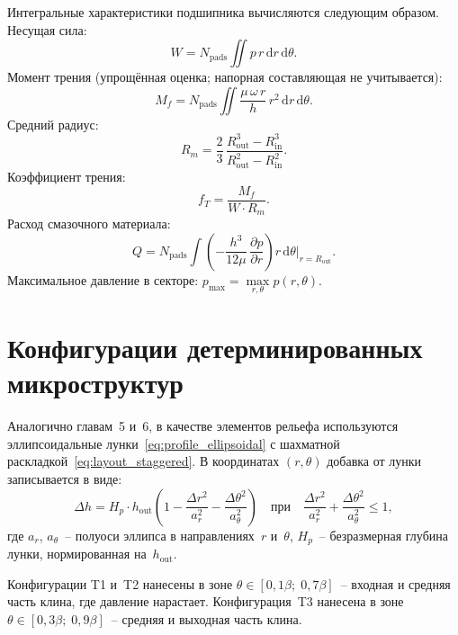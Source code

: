 Интегральные характеристики подшипника вычисляются следующим
образом. Несущая сила:
\begin{equation}
  W = N_{\mathrm{pads}} \iint p\, r\, \mathrm{d}r\, \mathrm{d}\theta.
  \label{eq:thrust_W}
\end{equation}
Момент трения (упрощённая оценка; напорная составляющая
не учитывается):
\begin{equation}
  M_f = N_{\mathrm{pads}} \iint
    \frac{\mu\, \omega\, r}{h}\, r^2\,
    \mathrm{d}r\, \mathrm{d}\theta.
  \label{eq:thrust_Mf}
\end{equation}
Средний радиус:
\begin{equation}
  R_m = \frac{2}{3}\,
    \frac{R_{\mathrm{out}}^3 - R_{\mathrm{in}}^3}
         {R_{\mathrm{out}}^2 - R_{\mathrm{in}}^2}.
  \label{eq:thrust_Rm}
\end{equation}
Коэффициент трения:
\begin{equation}
  f_T = \frac{M_f}{W \cdot R_m}.
  \label{eq:thrust_fT}
\end{equation}
Расход смазочного материала:
\begin{equation}
  Q = N_{\mathrm{pads}} \int
    \left(-\frac{h^3}{12\mu}\,
    \frac{\partial p}{\partial r}\right)
    r\, \mathrm{d}\theta
    \bigg|_{r = R_{\mathrm{out}}}.
  \label{eq:thrust_Q}
\end{equation}
Максимальное давление в секторе:
$p_{\max} = \max\limits_{r,\theta} p(r, \theta)$.


\section{Конфигурации детерминированных микроструктур}

Аналогично главам~5 и~6, в качестве элементов рельефа используются
эллипсоидальные лунки~\eqref{eq:profile_ellipsoidal}
с шахматной раскладкой~\eqref{eq:layout_staggered}.
В координатах $(r, \theta)$ добавка от лунки записывается
в виде:
\begin{equation}
  \Delta h = H_p \cdot h_{\mathrm{out}}
    \left(1 - \frac{\Delta r^2}{a_r^2}
    - \frac{\Delta\theta^2}{a_\theta^2}\right)
  \quad \text{при}\quad
    \frac{\Delta r^2}{a_r^2}
    + \frac{\Delta\theta^2}{a_\theta^2} \leq 1,
  \label{eq:thrust_dimple}
\end{equation}
где $a_r$, $a_\theta$~-- полуоси эллипса в направлениях~$r$
и~$\theta$, $H_p$~-- безразмерная глубина лунки, нормированная
на~$h_{\mathrm{out}}$.

Конфигурации T1 и~T2 нанесены в зоне
$\theta \in [0{,}1\beta;\; 0{,}7\beta]$~-- входная и средняя
часть клина, где давление нарастает. Конфигурация~T3 нанесена
в зоне $\theta \in [0{,}3\beta;\; 0{,}9\beta]$~-- средняя
и выходная часть клина.

